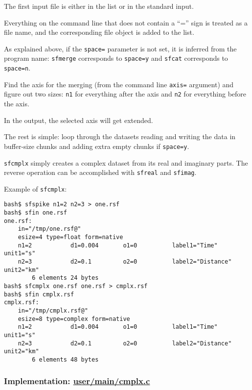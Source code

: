 The first input file is either in the list or in the standard input.

Everything on the command line that does not contain a ``='' sign is
treated as a file name, and the corresponding file object is added to the list.

As explained above, if the \texttt{space=} parameter is not set, it is
inferred from the program name: \texttt{sfmerge} corresponds to
\texttt{space=y} and \texttt{sfcat} corresponds to \texttt{space=n}.

Find the axis for the merging (from the command line \texttt{axis=}
argument) and figure out two sizes: \texttt{n1} for everything after
the axis and \texttt{n2} for everything before the axis.

In the output, the selected axis will get extended.

The rest is simple: loop through the datasets reading and writing the
data in buffer-size chunks and adding extra empty chunks if
\texttt{space=y}.

\noindent\doublebox{\parbox{\textwidth}{

}}

\texttt{sfcmplx} simply creates a complex dataset from its real and
imaginary parts. The reverse operation can be accomplished with
\texttt{sfreal} and \texttt{sfimag}.

Example of \texttt{sfcmplx}:
\begin{verbatim}
bash$ sfspike n1=2 n2=3 > one.rsf
bash$ sfin one.rsf
one.rsf:
    in="/tmp/one.rsf@"
    esize=4 type=float form=native
    n1=2           d1=0.004       o1=0          label1="Time" unit1="s"
    n2=3           d2=0.1         o2=0          label2="Distance" unit2="km"
        6 elements 24 bytes
bash$ sfcmplx one.rsf one.rsf > cmplx.rsf
bash$ sfin cmplx.rsf
cmplx.rsf:
    in="/tmp/cmplx.rsf@"
    esize=8 type=complex form=native
    n1=2           d1=0.004       o1=0          label1="Time" unit1="s"
    n2=3           d2=0.1         o2=0          label2="Distance" unit2="km"
        6 elements 48 bytes
\end{verbatim}

\subsubsection{Implementation: \href{http://rsf.svn.sourceforge.net/viewvc/rsf/trunk/user/main/cmplx.c?view=markup}{user/main/cmplx.c}}

